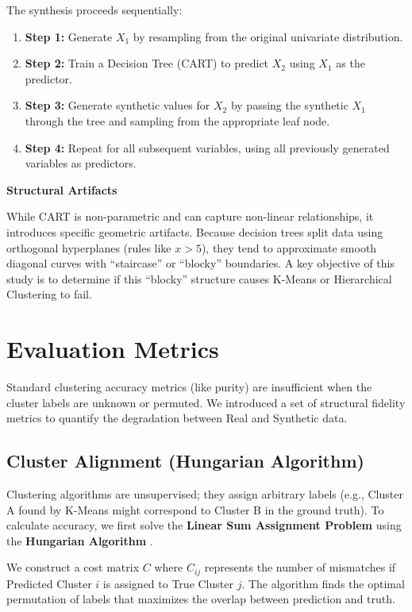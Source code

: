 The synthesis proceeds sequentially:
\begin{enumerate}
  \item \textbf{Step 1:} Generate $X_1$ by resampling from the original univariate distribution.
  \item \textbf{Step 2:} Train a Decision Tree (CART) to predict $X_2$ using $X_1$ as the predictor.
  \item \textbf{Step 3:} Generate synthetic values for $X_2$ by passing the synthetic $X_1$ through the tree and sampling from the appropriate leaf node.
  \item \textbf{Step 4:} Repeat for all subsequent variables, using all previously generated variables as predictors.
\end{enumerate}

\textbf{Structural Artifacts}

While CART is non-parametric and can capture non-linear relationships, it introduces specific geometric artifacts. Because decision trees split data using orthogonal hyperplanes (rules like $x > 5$), they tend to approximate smooth diagonal curves with ``staircase'' or ``blocky'' boundaries. A key objective of this study is to determine if this ``blocky'' structure causes K-Means or Hierarchical Clustering to fail.

\section{Evaluation Metrics}
\label{sec:evaluation-metrics-methods}

Standard clustering accuracy metrics (like purity) are insufficient when the cluster labels are unknown or permuted. We introduced a set of structural fidelity metrics to quantify the degradation between Real and Synthetic data.

\subsection{Cluster Alignment (Hungarian Algorithm)}
Clustering algorithms are unsupervised; they assign arbitrary labels (e.g., Cluster A found by K-Means might correspond to Cluster B in the ground truth). To calculate accuracy, we first solve the \textbf{Linear Sum Assignment Problem} using the \textbf{Hungarian Algorithm} \cite{kuhn1955}.

We construct a cost matrix $C$ where $C_{ij}$ represents the number of mismatches if Predicted Cluster $i$ is assigned to True Cluster $j$. The algorithm finds the optimal permutation of labels that maximizes the overlap between prediction and truth.

